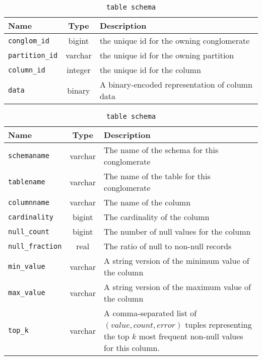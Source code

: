 \begin{table}
	\begin{tabular}{|l|c|p{6cm}|}
		\hline
		\bf{Name}											&	\bf{Type}	& \bf{Description} \\ \hline
		\texttt{conglom\_id}					&	bigint		&	the unique id for the owning conglomerate \\ \hline
		\texttt{partition\_id}				&	varchar		&	the unique id for the owning partition \\ \hline
		\texttt{column\_id}						&	integer		&	the unique id for the column \\ \hline
		\texttt{data}									&	binary		&	A binary-encoded representation of column data \\ \hline
	\end{tabular}
	\caption{\syscolumnstats \texttt{table schema}}
	\label{table:columnStats}
\end{table}

\begin{table}
	\begin{tabular}{|l|c|p{6cm}|}
		\hline
		\bf{Name}											&	\bf{Type}	& \bf{Description} \\ \hline
		\texttt{schemaname}						&	varchar		&	The name of the schema for this conglomerate \\ \hline
		\texttt{tablename}						&	varchar		&	The name of the table for this conglomerate \\ \hline
		\texttt{columnname}						&	varchar		&	The name of the column \\ \hline
		\texttt{cardinality}					&	bigint		&	The cardinality of the column \\ \hline
		\texttt{null\_count}					&	bigint		&	The number of null values for the column \\ \hline
		\texttt{null\_fraction}				&	real			&	The ratio of null to non-null records \\ \hline
		\texttt{min\_value}						&	varchar		&	A string version of the minimum value of the column \\ \hline
		\texttt{max\_value}						&	varchar		&	A string version of the maximum value of the column \\ \hline
		\texttt{top\_k}								&	varchar		&	A comma-separated list of $(value,count,error)$ tuples representing the top $k$ most frequent non-null values for this column. \\ \hline
	\end{tabular}
	\caption{\syscolumnstatistics \texttt{table schema}}
	\label{table:columnStatistics}
\end{table}

